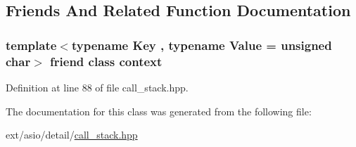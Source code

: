 \subsection{Friends And Related Function Documentation}
\hypertarget{classasio_1_1detail_1_1call__stack_ac78d499d6bdacfe4cc1f67b4ce865513}{}
\subsubsection[{context}]{\setlength{\rightskip}{0pt plus 5cm}template$<$typename Key , typename Value  = unsigned char$>$ friend class {\bf context}\hspace{0.3cm}{\ttfamily [friend]}}\label{classasio_1_1detail_1_1call__stack_ac78d499d6bdacfe4cc1f67b4ce865513}


Definition at line 88 of file call\+\_\+stack.\+hpp.



The documentation for this class was generated from the following file\+:\begin{DoxyCompactItemize}
\item 
ext/asio/detail/\hyperlink{call__stack_8hpp}{call\+\_\+stack.\+hpp}\end{DoxyCompactItemize}
